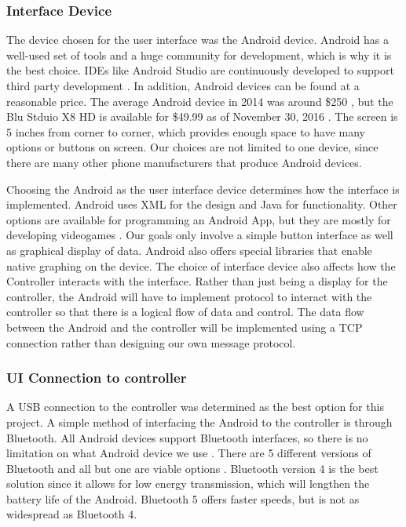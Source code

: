 \documentclass[draftclsnofoot,onecolumn,letterpaper,10pt]{IEEEtran}
\begin{document}
\subsubsection{Interface Device}
The device chosen for the user interface was the Android device.
Android has a well-used set of tools and a huge community for development, which is why it is the best choice.
IDEs like Android Studio are continuously developed to support third party development \cite{AndroidStudio}.
In addition, Android devices can be found at a reasonable price.
The average Android device in 2014 was around \$250 \cite{AndroidStats}, but the Blu Stduio X8 HD is available for \$49.99 as of November 30, 2016 \cite{BluStudioX8}.
The screen is 5 inches from corner to corner, which provides enough space to have many options or buttons on screen.
Our choices are not limited to one device, since there are many other phone manufacturers that produce Android devices.

Choosing the Android as the user interface device determines how the interface is implemented.
Android uses XML for the design and Java for functionality.
Other options are available for programming an Android App, but they are mostly for developing videogames \cite{Pygame}.
Our goals only involve a simple button interface as well as graphical display of data.
Android also offers special libraries that enable native graphing on the device. 
The choice of interface device also affects how the Controller interacts with the interface.
Rather than just being a display for the controller, the Android will have to implement protocol to interact with the controller so that there is a logical flow of data and control.
The data flow between the Android and the controller will be implemented using a TCP connection rather than designing our own message protocol.

\subsubsection{UI Connection to controller}
A USB connection to the controller was determined as the best option for this project.
A simple method of interfacing the Android to the controller is through Bluetooth.
All Android devices support Bluetooth interfaces, so there is no limitation on what Android device we use \cite{Bluetooth}.
There are 5 different versions of Bluetooth and all but one are viable options \cite{BlueVersions}.
Bluetooth version 4 is the best solution since it allows for low energy transmission, which will lengthen the battery life of the Android.
Bluetooth 5 offers faster speeds, but is not as widespread as Bluetooth 4.
\end{document}
